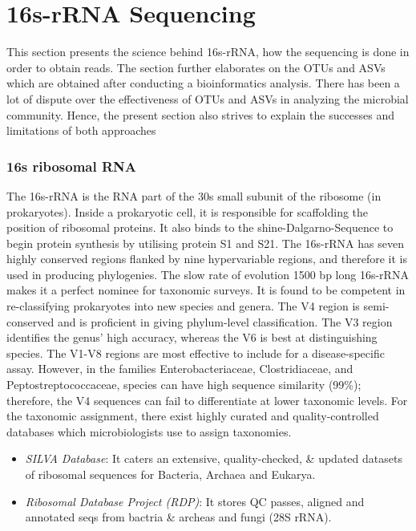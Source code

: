 \chapter{16s-rRNA Sequencing}
 \setcounter{page}{9}

This section presents the science behind 16s-rRNA, how the sequencing is done in order to obtain reads. The section further elaborates on the OTUs and ASVs which are obtained after conducting a bioinformatics analysis. There has been a lot of dispute over the effectiveness of OTUs and ASVs in analyzing the microbial community. Hence, the present section also strives to explain the successes and limitations of both approaches

\subsection{16s ribosomal RNA}
The 16s-rRNA is the RNA part of the 30s small subunit of the ribosome (in prokaryotes).  Inside a prokaryotic cell, it is responsible for scaffolding the position of ribosomal proteins. It also binds to the shine-Dalgarno-Sequence to begin protein synthesis by utilising protein S1 and S21. The 16s-rRNA has seven highly conserved regions flanked by nine hypervariable regions, and therefore it is used in producing phylogenies. The slow rate of evolution 1500 bp long 16s-rRNA makes it a perfect nominee for taxonomic surveys. It is found to be competent in re-classifying prokaryotes into new species and genera. The V4 region is semi-conserved and is proficient in giving phylum-level classification. The V3 region identifies the genus' high accuracy, whereas the V6 is best at distinguishing species. The V1-V8 regions are most effective to include for a disease-specific assay. However, in the families Enterobacteriaceae, Clostridiaceae, and Peptostreptococcaceae, species can have high sequence similarity (99\%); therefore, the V4 sequences can fail to differentiate at lower taxonomic levels. For the taxonomic assignment, there exist highly curated and quality-controlled databases which microbiologists use to assign taxonomies.

\begin{itemize}
  \item \textit{SILVA Database}: It caters an extensive, quality-checked, \& updated datasets of ribosomal sequences for Bacteria, Archaea and Eukarya.
  \item \textit{Ribosomal Database Project (RDP)}: It stores QC passes, aligned and annotated seqs from bactria \& archeas and fungi (28S rRNA).
\end{itemize}

